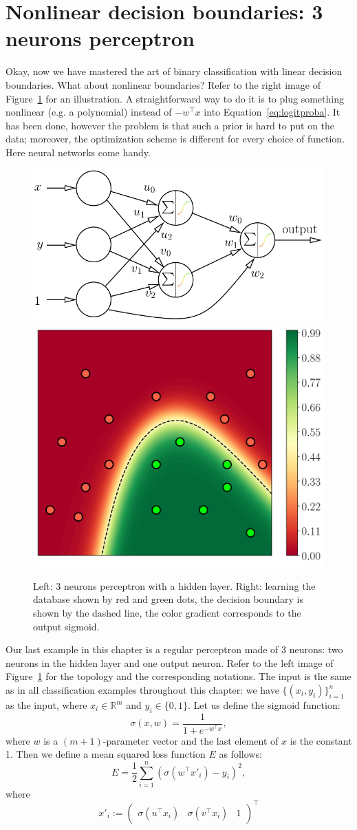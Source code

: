 \documentclass[notitlepage,oneside]{book}
\begin{document}
\section{Nonlinear decision boundaries: 3 neurons perceptron}
\label{sec:NN}
Okay, now we have mastered the art of binary classification with linear decision boundaries.
What about nonlinear boundaries? Refer to the right image of Figure~\ref{fig:neural} for an illustration.
A straightforward way to do it is to plug something nonlinear (e.g. a polynomial) instead of $-w^\top x$ into Equation~\eqref{eq:logitproba}.
It has been done, however the problem is that such a prior is hard to put on the data; moreover, the optimization scheme is different for every choice of function.
Here neural networks come handy.

\begin{figure}[t]
    \centering
    \includegraphics[width=.55\linewidth]{3neurons.png}
    \quad
    \includegraphics[width=.4\linewidth]{neural.png}
    \caption{Left: 3 neurons perceptron with a hidden layer. Right: learning the database shown by red and green dots, the decision boundary is shown by the dashed line, the color gradient corresponds to the output sigmoid.}
    \label{fig:neural}
\end{figure}

Our last example in this chapter is a regular perceptron made of 3 neurons: two neurons in the hidden layer and one output neuron.
Refer to the left image of Figure~\ref{fig:neural} for the topology and the corresponding notations.
The input is the same as in all classification examples throughout this chapter: we have $\{(x_i, y_i)\}_{i=1}^n$ as the input, where $x_i\in\mathbb R^m$ and $y_i\in \{0,1\}$.
Let us define the sigmoid function:
$$
\sigma(x,w) = \frac{1}{1+e^{-w^\top x}},
$$
where $w$ is a $(m+1)$-parameter vector and the last element of $x$ is the constant 1.
Then we define a mean squared loss function $E$ as follows:
$$
E = \frac{1}{2}\sum_{i=1}^{n} \left(\sigma\left(w^\top x'_i\right) - y_i\right)^2,
$$
where
$$
x'_i :=  \begin{pmatrix} \sigma(u^\top x_i) &  \sigma(v^\top x_i) & 1\end{pmatrix}^\top
$$
\end{document}

